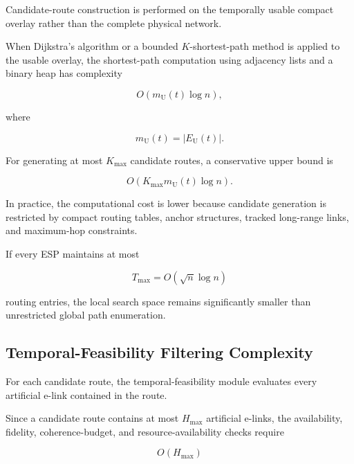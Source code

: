 Candidate-route construction is performed on the temporally usable compact overlay rather than the complete physical network.

When Dijkstra's algorithm or a bounded $K$-shortest-path method is applied to the usable overlay, the shortest-path computation using adjacency lists and a binary heap has complexity

\begin{equation}
    O
    \left(
    m_{\mathrm{U}}(t)
    \log n
    \right),
\end{equation}

where

\begin{equation}
    m_{\mathrm{U}}(t)
    =
    |E_{\mathrm{U}}(t)|.
\end{equation}

For generating at most $K_{\max}$ candidate routes, a conservative upper bound is

\begin{equation}
    O
    \left(
    K_{\max}
    m_{\mathrm{U}}(t)
    \log n
    \right).
\end{equation}

In practice, the computational cost is lower because candidate generation is restricted by compact routing tables, anchor structures, tracked long-range links, and maximum-hop constraints.

If every ESP maintains at most

\begin{equation}
    T_{\max}
    =
    O
    \left(
    \sqrt{n}\log n
    \right)
\end{equation}

routing entries, the local search space remains significantly smaller than unrestricted global path enumeration.

\subsection{Temporal-Feasibility Filtering Complexity}

For each candidate route, the temporal-feasibility module evaluates every artificial e-link contained in the route.

Since a candidate route contains at most $H_{\max}$ artificial e-links, the availability, fidelity, coherence-budget, and resource-availability checks require

\begin{equation}
    O
    \left(
    H_{\max}
    \right)
\end{equation}

